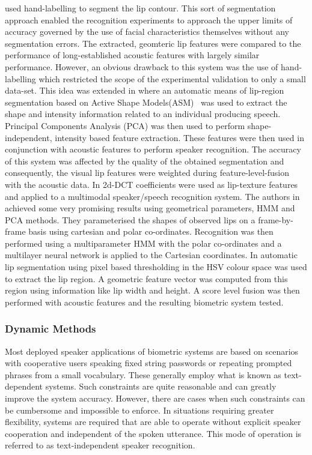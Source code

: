 \documentclass[a4paper, 10pt, conference]{ieeeconf}      %
\begin{document}
\cite{Chibelushi96Design} used hand-labelling to segment the lip contour. This sort of segmentation approach enabled the recognition experiments to approach the upper limits of accuracy governed by the use of facial characteristics themselves without any segmentation errors. The extracted, geomteric lip features were compared to the performance of long-established acoustic features with largely similar performance. However, an obvious drawback to this system was the use of hand-labelling which restricted the scope of the experimental validation to only a small data-set. This idea was extended in \cite{Jourlin97Acoustic} where an automatic means of lip-region segmentation based on Active Shape Models(ASM)~\cite{Cootes95Active} was used to extract the shape and intensity information related to an individual producing speech. Principal Components Analysis (PCA) \cite{Duda01Pattern} was then used to perform shape-independent, intensity based feature extraction. These features were then used in conjunction with acoustic features to perform speaker recognition. The accuracy of this system was affected by the quality of the obtained segmentation and consequently, the visual lip features were weighted during feature-level-fusion with the acoustic data. In \cite{Cetingul04Use} 2d-DCT coefficients were used as lip-texture features and applied to a multimodal speaker/speech recognition system. The authors in \cite{Gomez02Biometric} achieved some very promising results using geometrical parameters, HMM and PCA methods. They parameterised the shapes of observed lips on a frame-by-frame basis using cartesian and polar co-ordinates. Recognition was then performed using a multiparameter HMM with the polar co-ordinates and a multilayer neural network is applied to the Cartesian coordinates. In \cite{Broun02Automatic} automatic lip segmentation using pixel based thresholding in the HSV colour space was used to extract the lip region. A geometric feature vector was computed from this region using information like lip width and height. A score level fusion was then performed with acoustic features and the resulting biometric system tested.



\subsubsection{Dynamic Methods}
Most deployed speaker applications of biometric systems are based on scenarios with cooperative users speaking fixed string passwords or repeating prompted phrases from a small vocabulary. These generally employ what is known as text-dependent systems. Such constraints are quite reasonable and can greatly improve the system accuracy. However, there are cases when such constraints can be cumbersome and impossible to enforce. In situations requiring greater flexibility, systems are required that are able to operate without explicit speaker cooperation and independent of the spoken utterance. This mode of operation is referred to as text-independent speaker recognition.
\end{document}
